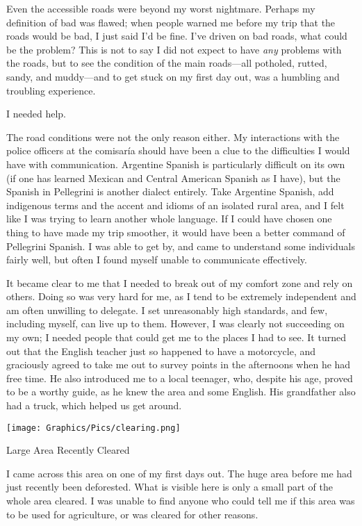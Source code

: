 Even the accessible roads were beyond my worst nightmare. Perhaps my definition of bad was flawed; when people warned me before my trip that the roads would be bad, I just said I’d be fine. I’ve driven on bad roads, what could be the problem? This is not to say I did not expect to have \textit{any} problems with the roads, but to see the condition of the main roads---all potholed, rutted, sandy, and muddy---and to get stuck on my first day out, was a humbling and troubling experience.

I needed help.

The road conditions were not the only reason either. My interactions with the police officers at the comisaría should have been a clue to the difficulties I would have with communication. Argentine Spanish is particularly difficult on its own (if one has learned Mexican and Central American Spanish as I have), but the Spanish in Pellegrini is another dialect entirely. Take Argentine Spanish, add indigenous terms and the accent and idioms of an isolated rural area, and I felt like I was trying to learn another whole language. If I could have chosen one thing to have made my trip smoother, it would have been a better command of Pellegrini Spanish. I was able to get by, and came to understand some individuals fairly well, but often I found myself unable to communicate effectively.

It became clear to me that I needed to break out of my comfort zone and rely on others. Doing so was very hard for me, as I tend to be extremely independent and am often unwilling to delegate. I set unreasonably high standards, and few, including myself, can live up to them. However, I was clearly not succeeding on my own; I needed people that could get me to the places I had to see. It turned out that the English teacher just so happened to have a motorcycle, and graciously agreed to take me out to survey points in the afternoons when he had free time. He also introduced me to a local teenager, who, despite his age, proved to be a worthy guide, as he knew the area and some English. His grandfather also had a truck, which helped us get around.

\begin{ssfigure}
  \centering
  \texttt{[image: Graphics/Pics/clearing.png]}
  \caption{Large Area Recently Cleared}
  \label{pic:clearing}
  \medskip
  \small
  I came across this area on one of my first days out. The huge area before me had just recently been deforested. What is visible here is only a small part of the whole area cleared. I was unable to find anyone who could tell me if this area was to be used for agriculture, or was cleared for other reasons.
\end{ssfigure}

